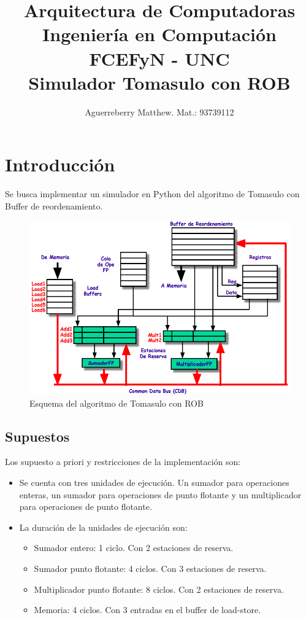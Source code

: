 \documentclass[a4paper]{article}
\begin{document}
	
	\title{%
	  Arquitectura de Computadoras \\
	  \large Ingeniería en Computación FCEFyN - UNC\\
			  Simulador Tomasulo con ROB
	  }
	
	
	  \author{Aguerreberry Matthew. Mat.: 93739112}
	  
	  \maketitle
	  
	  \section{Introducción}
	  
	  Se busca implementar un simulador en Python del algoritmo de Tomasulo con Buffer de reordenamiento.
	  
	  \begin{figure}[!h]
	  \centering
	  \includegraphics[width=.7\textwidth]{figures/esquema.png}
	  \caption{\label{fig:bloques}Esquema del algoritmo de Tomasulo con ROB}
	  \end{figure}

		
	\subsection{Supuestos}
	
	  Los supuesto a priori y restricciones de la implementación son:

	  \begin{itemize}
		  \item Se cuenta con tres unidades de ejecución. Un sumador para operaciones enteras, un sumador para operaciones de punto flotante y un multiplicador para operaciones de punto flotante.
		  \item La duración de la unidades de ejecución son:
		  \begin{itemize}
			  \item Sumador entero: 1 ciclo. Con 2 estaciones de reserva.
			  \item Sumador punto flotante: 4 ciclos. Con 3 estaciones de reserva.
			  \item Multiplicador punto flotante: 8 ciclos. Con 2 estaciones de reserva.
			  \item Memoria: 4 ciclos. Con 3 entradas en el buffer de load-store.
		  \end{itemize}
	  \end{itemize}
\end{document}
